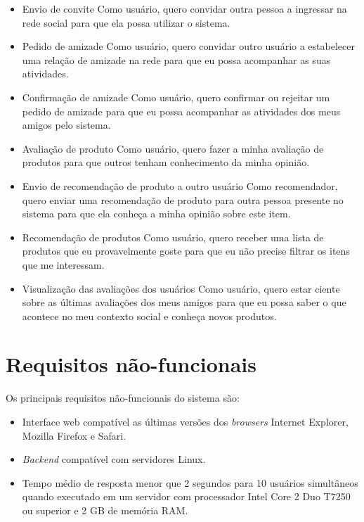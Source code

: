 \begin{itemize}
  
  \item Envio de convite
  \subitem Como usuário, quero convidar outra pessoa a ingressar na rede social para que ela possa utilizar o sistema.
  
  \item Pedido de amizade
  \subitem Como usuário, quero convidar outro usuário a estabelecer uma relação de amizade na rede para que eu possa acompanhar as suas atividades.
  
  \item Confirmação de amizade
  \subitem Como usuário, quero confirmar ou rejeitar um pedido de amizade para que eu possa acompanhar as atividades dos meus amigos pelo sistema.
	
	\item Avaliação de produto
  \subitem Como usuário, quero fazer a minha avaliação de produtos para que outros tenham conhecimento da minha opinião.
  
	\item Envio de recomendação de produto a outro usuário
  \subitem Como recomendador, quero enviar uma recomendação de produto para outra pessoa presente no sistema para que ela conheça a minha opinião sobre este item.
  
	\item Recomendação de produtos
	\subitem Como usuário, quero receber uma lista de produtos que eu provavelmente goste para que eu não precise filtrar os itens que me interessam.

    \item Visualização das avaliações dos usuários
    \subitem Como usuário, quero estar ciente sobre as últimas avaliações dos meus amigos para que eu possa saber o que acontece no meu contexto social e conheça novos produtos.
	
\end{itemize}

\section{Requisitos não-funcionais}

Os principais requisitos não-funcionais do sistema são:

\begin{itemize}

    \item Interface web compatível as últimas versões dos \textit{browsers} Internet Explorer, Mozilla Firefox e Safari.
    
    \item \textit{Backend} compatível com servidores Linux.

    \item Tempo médio de resposta menor que 2 segundos para 10 usuários simultâneos quando executado em um servidor com processador Intel Core 2 Duo T7250 ou superior e 2 GB de memória RAM. %

\end{itemize}

